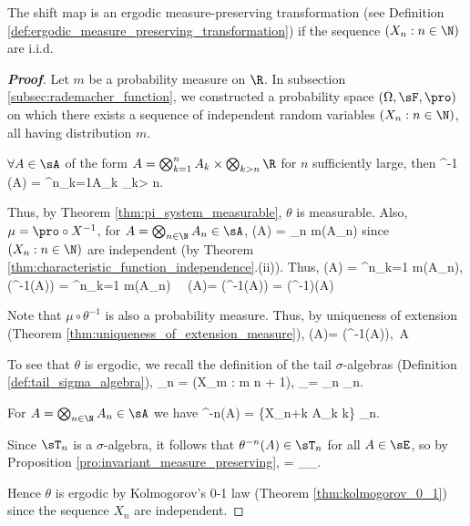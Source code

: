 \begin{theorem}\label{thm:measure_preserving}
The shift map is an ergodic measure-preserving transformation (see Definition \ref{def:ergodic_measure_preserving_transformation}) if the sequence $(X_n : n \in \N)$ are i.i.d.
\end{theorem}
\begin{proof}[\bf Proof]
Let $m$ be a probability measure on $\R$. In subsection \ref{subsec:rademacher_function}, we constructed a probability space $(\Omega,\sF,\pro)$ on which there exists a sequence of independent random variables $(X_n:n\in \N)$, all having distribution $m$.

$\forall A\in \sA$ of the form $A = \bigotimes^n_{k=1}A_k \times \bigotimes_{k>n}\R$ for $n$ sufficiently large, then
\be
\theta^{-1} (A) = \R\times \bigotimes^{n}_{k=1}A_k \times \bigotimes_{k> n}\R \in \sA \subseteq \sE.
\ee

Thus, by Theorem \ref{thm:pi_system_measurable}, $\theta$ is measurable. Also, $\mu = \pro \circ X^{-1}$, for $A = \bigotimes_{n\in\N} A_n \in \sA$,
\be
\mu(A) = \prod_{n\in \N} m(A_n)
\ee
since $(X_n : n \in \N)$ are independent (by Theorem \ref{thm:characteristic_function_independence}.(ii)). Thus,
\be
\mu(A) = \prod^n_{k=1} m(A_n),\quad \mu(\theta^{-1}(A)) = \prod^n_{k=1} m(A_n) \ \ra \ \mu(A)= \mu(\theta^{-1}(A)) = (\mu \circ \theta^{-1})(A)
\ee

Note that $\mu \circ \theta^{-1}$ is also a probability measure. Thus, by uniqueness of extension (Theorem \ref{thm:uniqueness_of_extension_measure}),
\be
\mu(A)= \mu(\theta^{-1}(A)),\ \forall A\in \sE \ \ra \ \theta {}
\ee



To see that $\theta$ is ergodic, we recall the definition of the tail $\sigma$-algebras (Definition \ref{def:tail_sigma_algebra}),
\be
\sT_n = \sigma(X_m : m \geq n + 1), \quad\quad \sT_\infty = \bigcap_n \sT_n.
\ee

For $A =\bigotimes_{n\in\N} A_n \in \sA$ we have
\be
\theta^{-n}(A) = \{X_{n+k} \in A_k k\} \in \sT_n.
\ee

Since $\sT_n$ is a $\sigma$-algebra, it follows that $\theta^{-n}(A) \in \sT_n$ for all $A \in \sE$, so by Proposition \ref{pro:invariant_measure_preserving},
\be
{} = \sE_\theta \subseteq \sT_\infty.
\ee

Hence $\theta$ is ergodic by Kolmogorov's 0-1 law (Theorem \ref{thm:kolmogorov_0_1}) since the sequence $X_n$ are independent.
\end{proof}

